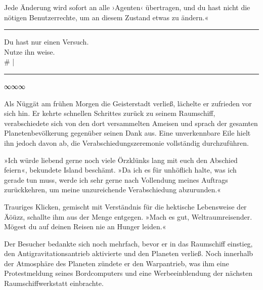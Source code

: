 Jede Änderung wird sofort an alle ›Agenten‹ übertragen, und du hast nicht die nötigen Benutzerrechte, um an diesem Zustand etwas zu ändern.«

\noindent \parbox{\textwidth}{ \vspace{3ex} \hrule \vspace{3ex}

    \begin{footnotesize}
    \begin{ttfamily}

\noindent Du hast nur einen Versuch.\\
\noindent Nutze ihn weise.\\
\noindent \# |

    \end{ttfamily}
    \end{footnotesize}

\vspace{3ex} \hrule \vspace{3ex} }

\begin{center}
∞∞∞
\end{center}

Als Nüggät am frühen Morgen die Geisterstadt verließ, lächelte er zufrieden vor sich hin. Er kehrte schnellen Schrittes zurück zu seinem Raumschiff, verabschiedete sich von den dort versammelten Ameisen und sprach der gesamten Planetenbevölkerung gegenüber seinen Dank aus. Eine unverkennbare Eile hielt ihn jedoch davon ab, die Verabschiedungszeremonie vollständig durchzuführen.

»Ich würde liebend gerne noch viele Örzklünks lang mit euch den Abschied feiern«, bekundete Island beschämt. »Da ich es für unhöflich halte, was ich gerade tun muss, werde ich sehr gerne nach Vollendung meines Auftrags zurückkehren, um meine unzureichende Verabschiedung abzurunden.«

Trauriges Klicken, gemischt mit Verständnis für die hektische Lebensweise der Äöüzz, schallte ihm aus der Menge entgegen. »Mach es gut, Weltraumreisender. Mögest du auf deinen Reisen nie an Hunger leiden.«

Der Besucher bedankte sich noch mehrfach, bevor er in das Raumschiff einstieg, den Antigravitationsantrieb aktivierte und den Planeten verließ. Noch innerhalb der Atmosphäre des Planeten zündete er den Warpantrieb, was ihm eine Protestmeldung seines Bordcomputers und eine Werbeeinblendung der nächsten Raumschiffwerkstatt einbrachte.


